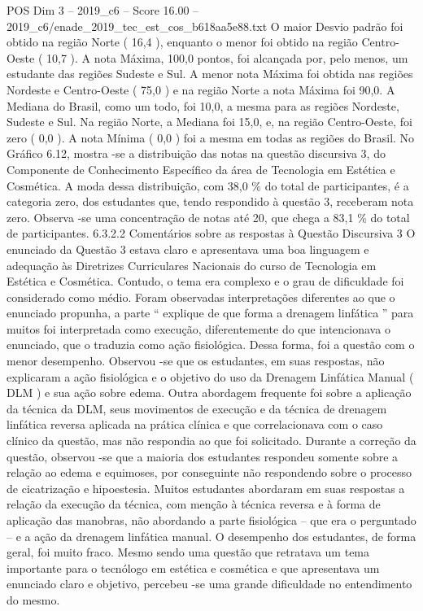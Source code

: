 \begin{textsample}{POS Dim 3 – 2019\_c6 – Score 16.00 – 2019\_c6/enade\_2019\_tec\_est\_cos\_b618aa5e88.txt}
O maior Desvio padrão foi obtido na região Norte ( 16,4 ), enquanto o menor foi obtido na região Centro-Oeste ( 10,7 ).
A nota Máxima, 100,0 pontos, foi alcançada por, pelo menos, um estudante das regiões Sudeste e Sul.
A menor nota Máxima foi obtida nas regiões Nordeste e Centro-Oeste ( 75,0 ) e na região Norte a nota Máxima foi 90,0.
A Mediana do Brasil, como um todo, foi 10,0, a mesma para as regiões Nordeste, Sudeste e Sul.
Na região Norte, a Mediana foi 15,0, e, na região Centro-Oeste, foi zero ( 0,0 ).
A nota Mínima ( 0,0 ) foi a mesma em todas as regiões do Brasil.
No Gráfico 6.12, mostra -se a distribuição das notas na questão discursiva 3, do Componente de Conhecimento Específico da área de Tecnologia em Estética e Cosmética.
A moda dessa distribuição, com 38,0 \% do total de participantes, é a categoria zero, dos estudantes que, tendo respondido à questão 3, receberam nota zero.
Observa -se uma concentração de notas até 20, que chega a 83,1 \% do total de participantes. 6.3.2.2 Comentários sobre as respostas à Questão Discursiva 3 O enunciado da Questão 3 estava claro e apresentava uma boa linguagem e adequação às Diretrizes Curriculares Nacionais do curso de Tecnologia em Estética e Cosmética.
Contudo, o tema era complexo e o grau de dificuldade foi considerado como médio.
Foram observadas interpretações diferentes ao que o enunciado propunha, a parte “ explique de que forma a drenagem linfática ” para muitos foi interpretada como execução, diferentemente do que intencionava o enunciado, que o traduzia como ação fisiológica.
Dessa forma, foi a questão com o menor desempenho.
Observou -se que os estudantes, em suas respostas, não explicaram a ação fisiológica e o objetivo do uso da Drenagem Linfática Manual ( DLM ) e sua ação sobre edema.
Outra abordagem frequente foi sobre a aplicação da técnica da DLM, seus movimentos de execução e da técnica de drenagem linfática reversa aplicada na prática clínica e que correlacionava com o caso clínico da questão, mas não respondia ao que foi solicitado.
Durante a correção da questão, observou -se que a maioria dos estudantes respondeu somente sobre a relação ao edema e equimoses, por conseguinte não respondendo sobre o processo de cicatrização e hipoestesia.
Muitos estudantes abordaram em suas respostas a relação da execução da técnica, com menção à técnica reversa e à forma de aplicação das manobras, não abordando a parte fisiológica – que era o perguntado – e a ação da drenagem linfática manual.
O desempenho dos estudantes, de forma geral, foi muito fraco.
Mesmo sendo uma questão que retratava um tema importante para o tecnólogo em estética e cosmética e que apresentava um enunciado claro e objetivo, percebeu -se uma grande dificuldade no entendimento do mesmo.

\end{textsample}
